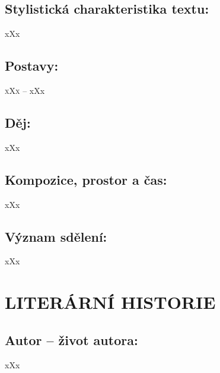 \documentclass{extarticle} %
\begin{document}
\subsection*{Stylistická charakteristika textu:}
\noindent 
xXx

\subsection*{Postavy:}
\noindent 
\textsc{xXx --} xXx \\

\subsection*{Děj:}
\noindent 
xXx

\subsection*{Kompozice, prostor a čas:}
\noindent 
xXx

\subsection*{Význam sdělení:}
\noindent 
xXx

\section*{LITERÁRNÍ HISTORIE}





\subsection*{Autor {\ssmall -- život autora:}}
\noindent 
xXx
\end{document}
